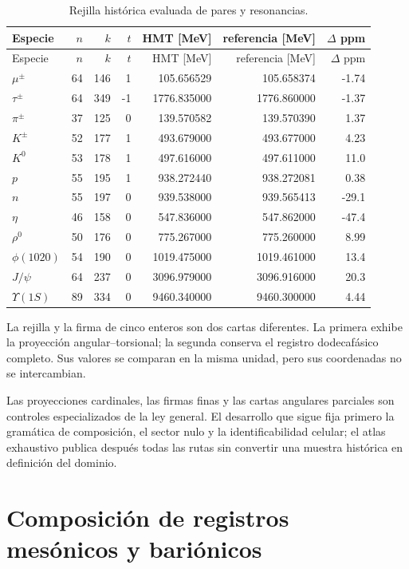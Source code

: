 \begin{longtable}{@{}lrrrrrr@{}}
\caption{Rejilla histórica evaluada de pares y resonancias.}
\label{tab:rejilla-extendida-resonancias-rev6}\\
\toprule
Especie&\(n\)&\(k\)&\(t\)&{HMT [MeV]}&{referencia [MeV]}&{\(\Delta\) ppm}\\
\midrule
\endfirsthead
\toprule
Especie&\(n\)&\(k\)&\(t\)&{HMT [MeV]}&{referencia [MeV]}&{\(\Delta\) ppm}\\
\midrule
\endhead
\(\mu^\pm\)&64&146&1&105.656529&105.658374&-1.74\\
\(\tau^\pm\)&64&349&-1&1776.835000&1776.860000&-1.37\\
\(\pi^\pm\)&37&125&0&139.570582&139.570390&1.37\\
\(K^\pm\)&52&177&1&493.679000&493.677000&4.23\\
\(K^0\)&53&178&1&497.616000&497.611000&11.0\\
\(p\)&55&195&1&938.272440&938.272081&0.38\\
\(n\)&55&197&0&939.538000&939.565413&-29.1\\
\(\eta\)&46&158&0&547.836000&547.862000&-47.4\\
\(\rho^0\)&50&176&0&775.267000&775.260000&8.99\\
\(\phi(1020)\)&54&190&0&1019.475000&1019.461000&13.4\\
\(J/\psi\)&64&237&0&3096.979000&3096.916000&20.3\\
\(\Upsilon(1S)\)&89&334&0&9460.340000&9460.300000&4.44\\
\bottomrule
\end{longtable}

La rejilla y la firma de cinco enteros son dos cartas diferentes. La primera
exhibe la proyección angular--torsional; la segunda conserva el registro
dodecafásico completo. Sus valores se comparan en la misma unidad, pero sus
coordenadas no se intercambian.
\fi

Las proyecciones cardinales, las firmas finas y las cartas angulares parciales
son controles especializados de la ley general. El desarrollo que sigue fija
primero la gramática de composición, el sector nulo y la identificabilidad
celular; el atlas exhaustivo publica después todas las rutas sin convertir una
muestra histórica en definición del dominio.

\section{Composición de registros mesónicos y bariónicos}

